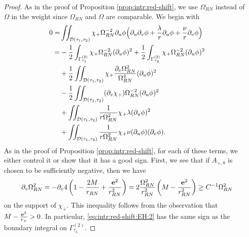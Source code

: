 \documentclass[10pt, reqno]{amsart}
\theoremstyle{definition}
\theoremstyle{remark}
\numberwithin{equation}{section}
\newcommand{\rd}{\partial}
\newcommand{\bb}{\Big}
\newcommand{\0}{\emptyset}
\newcommand{\Gmm}{\Gamma}
\newcommand{\lmb}{\lambda}
\newcommand{\Omg}{\Omega}
\newcommand{\bfe}{{\bf e}}
\newcommand{\calD}{\mathcal D}
\newcommand{\dvr}{\lmb}
\begin{document}
\begin{proof} 
As in the proof of Proposition \ref{prop:intr:red-shift}, we use $\Omg_{RN}$ instead of $\Omg$ in the weight since $\Omg_{RN}$ and $\Omg$ are comparable. We begin with
 \begin{align}
	0 =& \iint_{\calD(\tau_{1}, \tau_{2})} \chi_{+} \Omg_{RN}^{-2} \rd_{u} \phi 
				\bb( \rd_{u} \rd_{v} \phi + \frac{\dvr}{r} \rd_{u} \phi + \frac{\nu}{r} \rd_{v} \phi \bb) \notag \\
	=& 
		-\frac{1}{2} \int_{\Gmm^{(2)}_{\tau_{1}}} \chi_{+} \Omg_{RN}^{-2} (\rd_{u} \phi)^{2}
		+ \frac{1}{2} \int_{\Gmm^{(2)}_{\tau_{2}}} \chi_{+} \Omg_{RN}^{-2} (\rd_{u} \phi)^{2} 
				\label{eq:intr:red-shift:EH:1} \\
	& + \frac{1}{2} \iint_{\calD(\tau_{1}, \tau_{2})} \chi_{+} \frac{\rd_{v} \Omg_{RN}^{2}}{\Omg_{RN}^{4}} (\rd_{u} \phi)^{2} \label{eq:intr:red-shift:EH:2}\\
	&  - \frac{1}{2} \iint_{\calD(\tau_{1}, \tau_{2})} (\rd_v\chi_{+}) \Omg_{RN}^{-2}(\rd_{u}\phi)^{2} \label{eq:intr:red-shift:EH:3}\\
	 &  + \iint_{\calD(\tau_{1}, \tau_{2})} \frac{1}{r\Omg_{RN}^2} \chi_{+} \lambda (\rd_{u} \phi)^2 \label{eq:intr:red-shift:EH:4}\\
	&  + \iint_{\calD(\tau_{1}, \tau_{2})} \frac{1}{r\Omg_{RN}^2} \chi_{+} \nu(\rd_{u} \phi) (\rd_{v} \phi). \label{eq:intr:red-shift:EH:5}
\end{align}
As in the proof of Proposition \ref{prop:intr:red-shift}, for each of these terms, we either control it or show that it has a good sign. First, we see that if $A_{+,0}$ is chosen to be sufficiently negative, then we have
\begin{equation}\label{RS.EH.est}
	\rd_{v} \Omg^{2}_{RN} = - \rd_{v} 4 \left( 1 - \frac{2M}{r_{RN}} + \frac{\bfe^{2}}{r_{RN}^{2}} \right)  = 2 \frac{\Omg_{RN}^{2}}{r_{RN}^{2}} \left( M - \frac{\bfe^{2}}{r_{RN}^{2}} \right) \geq C^{-1} \Omg_{RN}^{2}
\end{equation}
 on the support of $\chi_{+}$. This inequality follows from the observation that $M - \frac{\bfe^{2}}{r_{+}} > 0$. In particular, \eqref{eq:intr:red-shift:EH:2} has the same sign as the boundary integral on $\Gmm^{(2)}_{\tau_{2}}$.


\end{proof}
\end{document}
